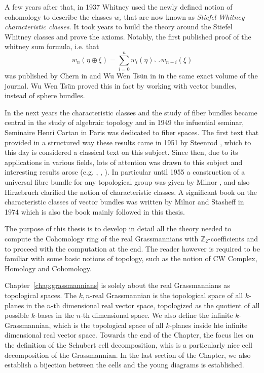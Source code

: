 A few years after that, in 1937 Whitney used \cite{whitneyCohom} the newly defined notion of cohomology to describe the classes $w_i$ that are now known as \emph{Stiefel Whitney characteristic classes}. It took years to build the theory around the Stiefel Whitney classes and prove the axioms. Notably, the first published proof of the whitney sum formula, i.e. that
\[w_n(\eta\oplus\xi)=\sum_{i=0}^nw_i(\eta)\smile w_{n-i}(\xi)\]
was published by Chern in \cite{chern} and Wu Wen Ts\"un in \cite{wu} in the same exact volume of the journal. Wu Wen Ts\"un proved this in fact by working with vector bundles, instead of sphere bundles.

In the next years the characteristic classes and the study of fiber bundles became central in the study of algebraic topology and in 1949 the infuential seminar, Seminaire Henri Cartan in Paris \cite{cartan1955seminaire} was dedicated to fiber spaces. The first text that provided in a structured way these results came in 1951 by Steenrod \cite{steenrod1951topology}, which to this day is considered a classical text on this subject.  Since then, due to its applications in various fields, lots of attention was drawn to this subject and interesting results arose (e.g. \cite{thom1952espaces}, \cite{borel1955topology}, \cite{hirzebruch1956}). In particular until 1955 a construction of a universal fibre bundle for any topological group was given by Milnor \cite{milnor1956construction} \cite{milnor1956construction2}, and also Hirzebruch clarified the notion of characteristic classes. A significant book on the characteristic classes of vector bundles was written by Milnor and Stasheff in 1974 \cite{char_class} which is also the book mainly followed in this thesis.

The purpose of this thesis is to develop in detail all the theory needed to compute the Cohomology ring of the real Grassmannians with $\mathbb{Z}_2$-coefficients and to proceed with the computation at the end. The reader however is required to be familiar with some basic notions of topology, such as the notion of CW Complex, Homology and Cohomology.

Chapter~\ref{chap:grassmannians} is solely about the real Grassmannians as topological spaces. The $k,n$-real Grassmannian is the topological space of all $k$-planes in the $n$-th dimensional real vector space, topologized as the quotient of all possible $k$-bases in the $n$-th dimensional space. We also define the infinite $k$-Grassmannian, which is the topological space of all $k$-planes inside hte infinite dimensional real vector space. Towards the end of the Chapter, the focus lies on the definition of the Schubert cell decomposition, whis is a particularly nice cell decomposition of the Grassmannian. In the last section of the Chapter, we also establish a bijection between the cells and the young diagrams is established.

